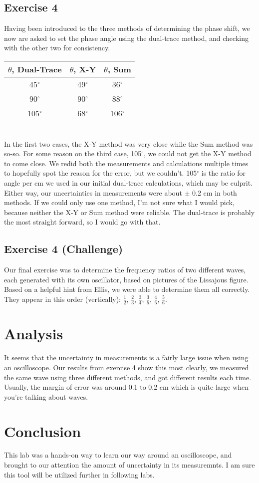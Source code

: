 \documentclass[a4paper,12pt]{article}
\begin{document}
\subsection{Exercise 4}
Having been introduced to the three methods of determining the phase
shift, we now are asked to set the phase angle using the dual-trace
method, and checking with the other two for consistency. \\

\begin{tabular}{|c|c|c|}
  \hline
  $\theta$, Dual-Trace & $\theta$, X-Y & $\theta$, Sum \\
  \hline
  45$^{\circ}$ & 49$^{\circ}$ & 36$^{\circ}$ \\
  \hline
  90$^{\circ}$ & 90$^{\circ}$ & 88$^{\circ}$ \\
  \hline
  105$^{\circ}$ & 68$^{\circ}$ & 106$^{\circ}$ \\
  \hline
\end{tabular} \\

In the first two cases, the X-Y method was very close while the Sum
method was so-so. For some reason on the third case, 105$^{\circ}$, we
could not get the X-Y method to come close. We redid both the
measurements and calculations multiple times to hopefully spot the
reason for the error, but we couldn't. 105$^{\circ}$ is the ratio for
angle per cm we used in our initial dual-trace calculations, which may
be culprit. Either way, our uncertainties in measurements were about
$\pm$ 0.2 cm in both methods. If we could only use one method, I'm not
sure what I would pick, because neither the X-Y or Sum method were
reliable. The dual-trace is probably the most straight forward, so I
would go with that.

\subsection{Exercise 4 (Challenge)}
Our final exercise was to determine the frequency ratios of two
different waves, each generated with its own oscillator, based on
pictures of the Lissajous figure. Based on a helpful hint from Ellis,
we were able to determine them all correctly. They appear in this
order (vertically): $\frac{1}{2}$, $\frac{2}{3}$, $\frac{3}{4}$,
$\frac{3}{5}$, $\frac{4}{5}$, $\frac{5}{6}$.

\section{Analysis}
It seems that the uncertainty in measurements is a fairly large issue
when using an oscilloscope. Our results from exercise 4 show this most
clearly, we measured the same wave using three different methods, and
got different results each time. Usually, the margin of error was
around 0.1 to 0.2 cm which is quite large when you're talking about
waves. 

\section{Conclusion}
This lab was a hands-on way to learn our way around an oscilloscope,
and brought to our attention the amount of uncertainty in its
measuremnts. I am sure this tool will be utilized further in following
labs.
\end{document}
